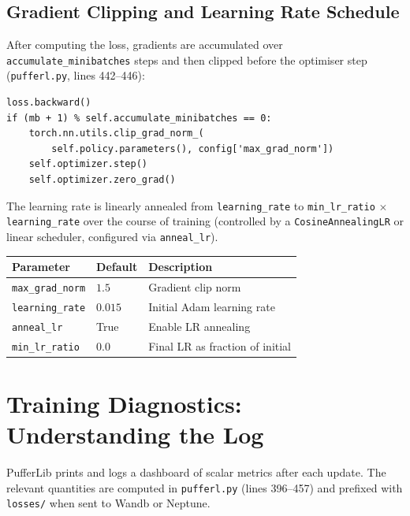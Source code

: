 \documentclass[12pt, a4paper]{article}
\theoremstyle{definition}
\theoremstyle{plain}
\theoremstyle{remark}
\begin{document}
\subsection{Gradient Clipping and Learning Rate Schedule}

After computing the loss, gradients are accumulated over \texttt{accumulate\_minibatches}
steps and then clipped before the optimiser step (\texttt{pufferl.py}, lines 442--446):

\begin{lstlisting}[style=pythonstyle,
  caption={Gradient clipping (\texttt{pufferl.py}, lines 442--446).}]
loss.backward()
if (mb + 1) % self.accumulate_minibatches == 0:
    torch.nn.utils.clip_grad_norm_(
        self.policy.parameters(), config['max_grad_norm'])
    self.optimizer.step()
    self.optimizer.zero_grad()
\end{lstlisting}

The learning rate is linearly annealed from \texttt{learning\_rate} to
\texttt{min\_lr\_ratio} $\times$ \texttt{learning\_rate} over the course of training
(controlled by a \texttt{CosineAnnealingLR} or linear scheduler, configured via
\texttt{anneal\_lr}).

\begin{center}
\begin{tabular}{lll}
  \toprule
  Parameter & Default & Description \\
  \midrule
  \texttt{max\_grad\_norm} & $1.5$   & Gradient clip norm \\
  \texttt{learning\_rate}  & $0.015$ & Initial Adam learning rate \\
  \texttt{anneal\_lr}      & True    & Enable LR annealing \\
  \texttt{min\_lr\_ratio}  & $0.0$   & Final LR as fraction of initial \\
  \bottomrule
\end{tabular}
\end{center}

\section{Training Diagnostics: Understanding the Log}
\label{sec:log}

PufferLib prints and logs a dashboard of scalar metrics after each update.  The
relevant quantities are computed in \texttt{pufferl.py} (lines 396--457) and prefixed
with \texttt{losses/} when sent to Wandb or Neptune.
\end{document}
